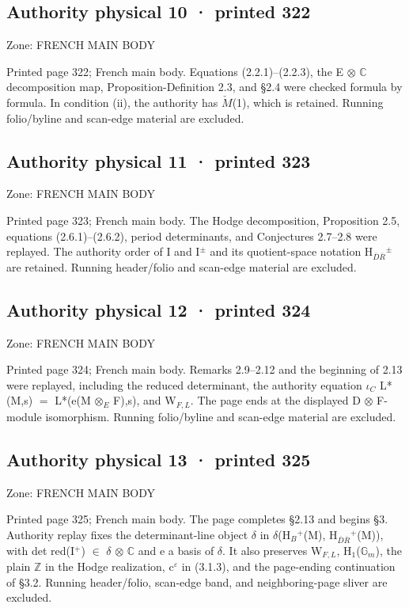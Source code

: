 \documentclass[10pt,twoside]{article}
\begin{document}
\subsection*{Authority physical 10 · printed 322}
\noindent\textsf{Zone: FRENCH MAIN BODY}\par
Printed page 322; French main body. Equations (2.2.1)–(2.2.3), the E \ensuremath{⊗} \ensuremath{ℂ} decomposition map, Proposition-Definition 2.3, and \S{}2.4 were checked formula by formula. In condition (ii), the authority has \ensuremath{\check{M}}(1), which is retained. Running folio/byline and scan-edge material are excluded.\par
\subsection*{Authority physical 11 · printed 323}
\noindent\textsf{Zone: FRENCH MAIN BODY}\par
Printed page 323; French main body. The Hodge decomposition, Proposition 2.5, equations (2.6.1)–(2.6.2), period determinants, and Conjectures 2.7–2.8 were replayed. The authority order of I and I\ensuremath{^{±}} and its quotient-space notation H\ensuremath{_{\overline{D}\overline{R}}}\ensuremath{^{±}} are retained. Running header/folio and scan-edge material are excluded.\par
\subsection*{Authority physical 12 · printed 324}
\noindent\textsf{Zone: FRENCH MAIN BODY}\par
Printed page 324; French main body. Remarks 2.9–2.12 and the beginning of 2.13 were replayed, including the reduced determinant, the authority equation \ensuremath{ι}\ensuremath{_{C}} L*(M,s) \ensuremath{=} L*(e(M \ensuremath{⊗}\ensuremath{_{E}} F),s), and W\ensuremath{_{F,L}}. The page ends at the displayed D \ensuremath{⊗} F-module isomorphism. Running folio/byline and scan-edge material are excluded.\par
\subsection*{Authority physical 13 · printed 325}
\noindent\textsf{Zone: FRENCH MAIN BODY}\par
Printed page 325; French main body. The page completes \S{}2.13 and begins \S{}3. Authority replay fixes the determinant-line object \ensuremath{δ} in \ensuremath{δ}(H\ensuremath{_{B}}\ensuremath{^{+}}(M), H\ensuremath{_{\overline{D}\overline{R}}}\ensuremath{^{+}}(M)), with det red(I\ensuremath{^{+}}) \ensuremath{∈} \ensuremath{δ} \ensuremath{⊗} \ensuremath{ℂ} and e a basis of \ensuremath{δ}. It also preserves W\ensuremath{_{F,L}}, H\ensuremath{_{1}}(\ensuremath{𝔾}\ensuremath{_{m}}), the plain \ensuremath{ℤ} in the Hodge realization, c\ensuremath{^{ε}} in (3.1.3), and the page-ending continuation of \S{}3.2. Running header/folio, scan-edge band, and neighboring-page sliver are excluded.\par
\end{document}
